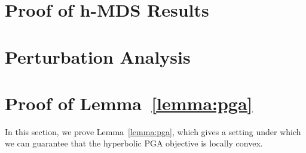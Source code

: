\section{Proof of h-MDS Results}
\label{sec:mds-proof}

% 



\section{Perturbation Analysis}



\section{Proof of Lemma~\ref{lemma:pga}}

In this section, we prove Lemma~\ref{lemma:pga}, which gives a setting under which we can guarantee that the hyperbolic PGA objective is locally convex.


